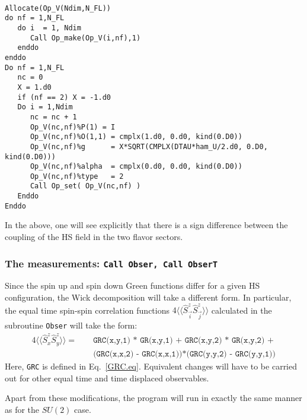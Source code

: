 \begin{lstlisting}

Allocate(Op_V(Ndim,N_FL))
do nf = 1,N_FL
   do i  = 1, Ndim
      Call Op_make(Op_V(i,nf),1)
   enddo
enddo
Do nf = 1,N_FL
   nc = 0
   X = 1.d0
   if (nf == 2) X = -1.d0
   Do i = 1,Ndim
      nc = nc + 1
      Op_V(nc,nf)%P(1) = I
      Op_V(nc,nf)%O(1,1) = cmplx(1.d0, 0.d0, kind(0.D0))
      Op_V(nc,nf)%g      = X*SQRT(CMPLX(DTAU*ham_U/2.d0, 0.D0, kind(0.D0))) 
      Op_V(nc,nf)%alpha  = cmplx(0.d0, 0.d0, kind(0.D0))
      Op_V(nc,nf)%type   = 2
      Call Op_set( Op_V(nc,nf) )
   Enddo
Enddo

\end{lstlisting}
In the above, one will see explicitly that  there is a sign   difference between  the coupling of the HS field  in  the  two flavor sectors.  

 \subsubsection{The  measurements: \texttt{Call Obser, Call  ObserT} } 

 Since  the spin up and spin down Green functions differ  for a given HS configuration,  the Wick decomposition will take a different form. In particular, the  equal time spin-spin correlation functions 
 $ 4 \langle \langle \hat{S}^{z}_{\vec{i}}   \hat{S}^{z}_{\vec{j}} \rangle \rangle   $  calculated in the subroutine  \texttt{Obser}  will take the form: 
  \begin{eqnarray}
   4 \langle \langle \hat{S}^{z}_{x}   \hat{S}^{z}_{y} \rangle \rangle   =  & &  \texttt{  GRC(x,y,1) * GR(x,y,1) + GRC(x,y,2) * GR(x,y,2) + }  \nonumber \\ 
& & \texttt{   (GRC(x,x,2) - GRC(x,x,1))*(GRC(y,y,2) - GRC(y,y,1))}  \nonumber
  \end{eqnarray}
Here,  \texttt{GRC}  is defined in Eq.~\ref{GRC.eq}.  Equivalent changes will have to be carried out for other equal time and time displaced observables. 
  
Apart from these modifications, the program  will run in exactly the same manner as for the $SU(2)$ case. 
    
  
